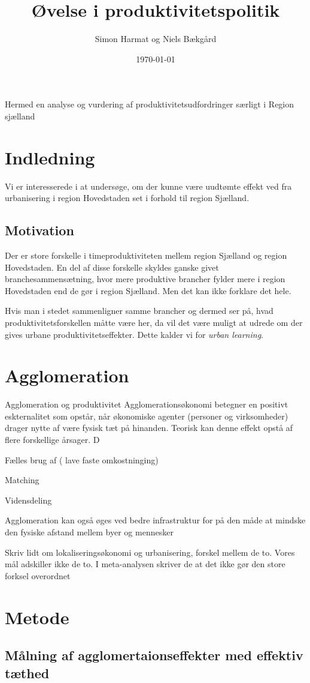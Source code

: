 \documentclass[a4paper, 12pt]{article}
\author{Simon Harmat og Niels Bækgård}
\title{Øvelse i produktivitetspolitik}
\date{\today}
\begin{document}
Hermed en analyse og vurdering af produktivitetsudfordringer særligt i Region sjælland

\section{Indledning}
Vi er interesserede i at undersøge, om der kunne være uudtømte effekt ved fra urbanisering i region Hovedstaden set i forhold til region Sjælland. 
\subsection{Motivation}
Der er store forskelle i timeproduktiviteten mellem region Sjælland og region Hovedstaden. En del af disse forskelle skyldes ganske givet branchesammensætning, hvor mere produktive brancher fylder mere i region Hovedstaden end de gør i region Sjælland. Men det kan ikke forklare det hele.

Hvis man i stedet sammenligner samme brancher og dermed ser på, hvad produktivitetsforskellen måtte være her, da vil det være muligt at udrede om der gives urbane produktivitetseffekter. Dette kalder vi for \emph{urban learning}.
\section{Agglomeration}

Agglomeration og produktivitet
Agglomerationsøkonomi betegner en positivt eskternalitet som opstår, når økonomiske agenter (personer og virksomheder) drager nytte af være fysisk tæt på hinanden. Teorisk kan denne effekt opstå af flere forskellige årsager. D

Fælles brug af ( lave faste omkostninging) 



Matching


Vidensdeling 

Agglomeration kan også øges ved bedre infrastruktur for på den måde at mindske den fysiske afstand mellem byer og mennesker

Skriv lidt om lokaliseringsøkonomi og urbanisering, forskel mellem de to. Vores mål adskiller ikke de to. I meta-analysen skriver de at det ikke gør den store forksel overordnet

\section{Metode}
\subsection{Målning af agglomertaionseffekter med effektiv tæthed }
\end{document}
